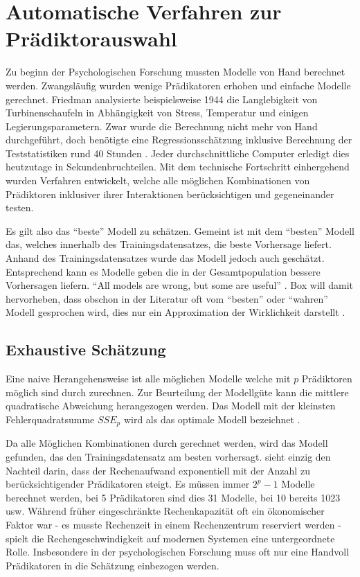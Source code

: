 \section{Automatische Verfahren zur Prädiktorauswahl}
Zu beginn der Psychologischen Forschung mussten Modelle von Hand berechnet werden. Zwangsläufig wurden wenige Prädikatoren erhoben und einfache Modelle gerechnet. 
Friedman analysierte beispielsweise 1944 die Langlebigkeit von Turbinenschaufeln in Abhängigkeit von Stress, Temperatur und einigen Legierungsparametern. 
Zwar wurde die Berechnung nicht mehr von Hand durchgeführt, doch benötigte eine Regressionsschätzung inklusive Berechnung der Teststatistiken rund 40 Stunden \cite[p.2]{armstrong2011illusions}. Jeder durchschnittliche Computer erledigt dies heutzutage in Sekundenbruchteilen. 
Mit dem technische Fortschritt einhergehend wurden Verfahren entwickelt, welche alle möglichen Kombinationen von Prädiktoren inklusiver ihrer Interaktionen berücksichtigen und gegeneinander testen.

Es gilt also das ``beste'' Modell zu schätzen. 
Gemeint ist mit dem ``besten'' Modell das, welches innerhalb des Trainingsdatensatzes, die beste Vorhersage liefert. 
Anhand des Trainingsdatensatzes wurde das Modell jedoch auch geschätzt. Entsprechend kann es Modelle geben die in der Gesamtpopulation bessere Vorhersagen liefern. 
``All models are wrong, but some are useful'' \cite[p.202]{box1979robustness}.
Box will damit hervorheben, dass obschon in der Literatur oft vom ``besten'' oder ``wahren'' Modell gesprochen wird, dies nur ein Approximation der Wirklichkeit darstellt \cite[p.172]{weakliem2004introduction}.

\subsection{Exhaustive Schätzung} 
Eine naive Herangehensweise ist alle möglichen Modelle welche mit $p$ Prädiktoren möglich sind durch zurechnen. 
Zur Beurteilung der Modellgüte kann die mittlere quadratische Abweichung herangezogen werden.
Das Modell mit der kleinsten Fehlerquadratsumme $SSE_p$ wird als das  optimale Modell bezeichnet \cite[p. 6]{thompson1978selection}. 


Da alle Möglichen Kombinationen durch gerechnet werden, wird das  Modell gefunden, das den Trainingsdatensatz am besten vorhersagt.
 sieht einzig den Nachteil darin, dass der Rechenaufwand exponentiell mit der Anzahl zu berücksichtigender Prädikatoren steigt. 
Es müssen immer $2^p-1$ Modelle berechnet werden, bei 5 Prädikatoren sind dies 31 Modelle, bei 10 bereits 1023 usw.
Während früher eingeschränkte Rechenkapazität oft ein ökonomischer Faktor war - es musste Rechenzeit in einem Rechenzentrum reserviert werden - spielt die Rechengeschwindigkeit auf modernen Systemen eine untergeordnete Rolle. 
Insbesondere in der psychologischen Forschung muss oft nur eine Handvoll Prädikatoren in die Schätzung einbezogen werden.

